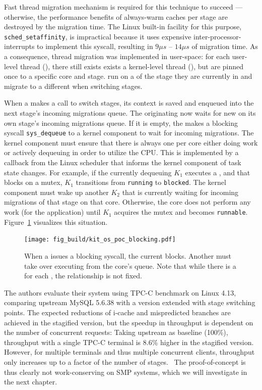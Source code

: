 \documentclass[12pt,a4paper]{book}
\begin{document}
Fast thread migration mechanism is required for this technique to succeed
--- otherwise, the performance benefits of always-warm caches per stage are destroyed by the migration time.
The Linux built-in facility for this purpose, \texttt{sched\_setaffinity}, is impractical because it uses
expensive inter-processor-interrupts to implement this syscall, resulting in $9\mu s$ -- $14\mu s$ of migration time.
As a consequence, thread migration was implemented in user-space:
for each user-level thread (\ult), there still exists exists a kernel-level thread (\klt),
but \klts are pinned once to a specific core and stage.
\ults run on a \klt of the stage they are currently in and migrate to a different \klt when switching stages.~\cite{sodaspr}%

When a \ult makes a call to switch stages, its context is saved and enqueued into the next stage's incoming migrations queue.
The originating \klt now waits for new \ults on its own stage's incoming migrations queue.
If it is empty, the \klt makes a blocking syscall \texttt{sys\_dequeue} to a kernel component to wait for incoming migrations.
The kernel component must ensure that there is always one \klt per core either doing work or actively dequeuing \ults in order to utilize the CPU.
This is implemented by a callback from the Linux scheduler that informs the kernel component of task state changes.
For example, if the currently dequeuing \klt $K_1$ executes a \ult, and that \ult blocks on a mutex, $K_1$ transitions from \texttt{running} to \texttt{blocked}.
The kernel component must wake up another \klt $K_2$ that is currently waiting for incoming migrations of that stage on that core.
Otherwise, the core does not perform any work (for the application) until $K_1$ acquires the mutex and becomes \texttt{runnable}.
Figure~\ref{fig:kit_os_poc_blocking} visualizes this situation.

\begin{figure}[h]
    \centering
    \texttt{[image: fig\_build/kit\_os\_poc\_blocking.pdf]}
    \caption{When a \ult issues a blocking syscall, the current \klt blocks. Another \klt must take over executing \ults from the core's queue. Note that while there is a \klt for each \ult, the relationship is not fixed.}
    \label{fig:kit_os_poc_blocking}
\end{figure}

The authors evaluate their system using TPC-C benchmark on Linux 4.13, comparing upstream MySQL 5.6.38 with a version extended with stage switching points.
The expected reductions of i-cache and mispredicted branches are achieved in the stagified version, but the speedup in throughput is dependent on the number of concurrent requests:
Taking upstream as baseline (100\%), throughput with a single TPC-C terminal is 8.6\% higher in the stagified version.
However, for multiple terminals and thus multiple concurrent clients, throughput only increases up to a factor of the number of stages.~
The proof-of-concept is thus clearly not work-conserving on SMP systems, which we will investigate in the next chapter.
\end{document}

